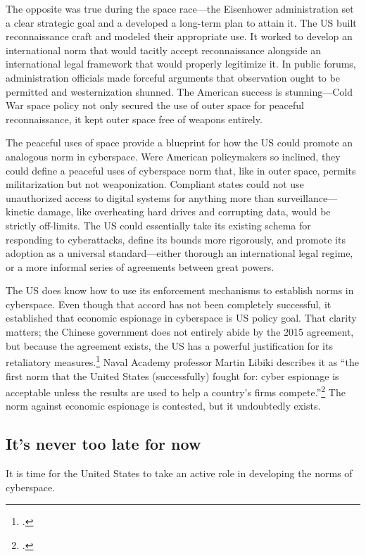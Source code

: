 \documentclass[11pt]{memoir}
\begin{document}
The opposite was true during the space race---the Eisenhower administration set a clear strategic goal and a developed a long-term plan to attain it. The US built reconnaissance craft and modeled their appropriate use. It worked to develop an international norm that would tacitly accept reconnaissance alongside an international legal framework that would properly legitimize it. In public forums, administration officials made forceful arguments that observation ought to be permitted and westernization shunned. The American success is stunning---Cold War space policy not only secured the use of outer space for peaceful reconnaissance, it kept outer space free of weapons entirely.

The peaceful uses of space provide a blueprint for how the US could promote an analogous norm in cyberspace. Were American policymakers so inclined, they could define a peaceful uses of cyberspace norm that, like in outer space, permits militarization but not weaponization. Compliant states could not use unauthorized access to digital systems for anything more than surveillance---kinetic damage, like overheating hard drives and corrupting data, would be strictly off-limits. The US could essentially take its existing schema for responding to cyberattacks, define its bounds more rigorously, and promote its adoption as a universal standard---either thorough an international legal regime, or a more informal series of agreements between great powers.

The US does know how to use its enforcement mechanisms to establish norms in cyberspace. Even though that accord has not been completely successful, it established that economic espionage in cyberspace is US policy goal. That clarity matters; the Chinese government does not entirely abide by the 2015 agreement, but because the agreement exists, the US has a powerful justification for its retaliatory measures.\footcite{bartz_u.s._2018} Naval Academy professor Martin Libiki describes it as ``the first norm that the United States (successfully) fought for: cyber espionage is acceptable unless the results are used to help a country’s firms compete.''\footcite{libicki_coming_2017} The norm against economic espionage is contested, but it undoubtedly exists.

\subsection{It's never too late for now}
It is time for the United States to take an active role in developing the norms of cyberspace.
\end{document}
